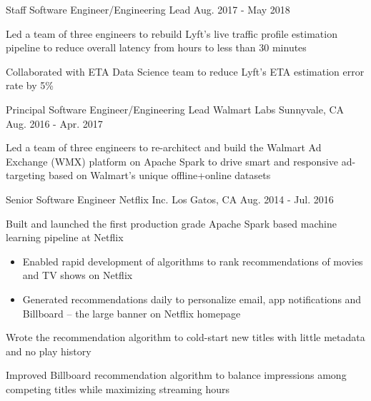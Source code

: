 \begin{cventries}
  \cventry
    {Staff Software Engineer/Engineering Lead} %
    {} %
    {} %
    {Aug. 2017 - May 2018} %
    {
      \begin{cvitems} %
        \item{Led a team of three engineers to rebuild Lyft's live traffic profile estimation pipeline to reduce overall latency from hours to less than 30 minutes}
        \item{Collaborated with ETA Data Science team to reduce Lyft's ETA estimation error rate by 5\%}
      \end{cvitems}
    }

  \cventry
    {Principal Software Engineer/Engineering Lead} %
    {Walmart Labs} %
    {Sunnyvale, CA} %
    {Aug. 2016 - Apr. 2017} %
    {
      \begin{cvitems} %
        \item{Led a team of three engineers to re-architect and build the Walmart Ad Exchange (WMX) platform on Apache Spark to drive smart and responsive ad-targeting based on Walmart’s unique offline+online datasets}
      \end{cvitems}
    }

  \cventry
    {Senior Software Engineer} %
    {Netflix Inc.} %
    {Los Gatos, CA} %
    {Aug. 2014 - Jul. 2016} %
    {
      \begin{cvitems} %
        \item{Built and launched the first production grade Apache Spark based machine learning pipeline at Netflix}
          \begin{itemize}[label=$\circ$]
            \item{Enabled rapid development of algorithms to rank recommendations of movies and TV shows on Netflix}
            \item{Generated recommendations daily to personalize email, app notifications and Billboard – the large banner on Netflix homepage}
          \end{itemize}
        \item{Wrote the recommendation algorithm to cold-start new titles with little metadata and no play history}
        \item{Improved Billboard recommendation algorithm to balance impressions among competing titles while maximizing streaming hours}
      \end{cvitems}
    }


\end{cventries}
